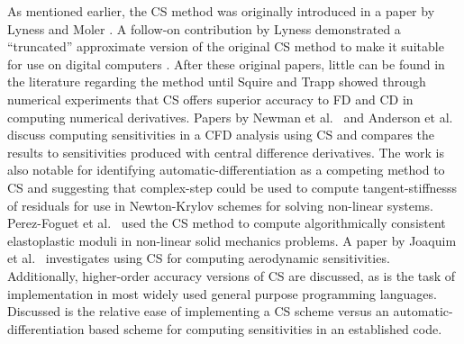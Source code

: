 \documentclass[preprint,12pt]{elsarticle}
\begin{document}
As mentioned earlier, the CS method was originally introduced in a paper by Lyness and Moler \cite{lyness1967numerical}.  A follow-on contribution by Lyness demonstrated a ``truncated'' approximate version of the original CS method to make it suitable for use on digital computers \cite{lyness1968differentiation}.  After these original papers, little can be found in the literature regarding the method until Squire and Trapp showed through numerical experiments that CS offers superior accuracy to FD and CD \cite{squire1998using} in computing numerical derivatives. Papers by Newman et al.\ \cite{newman1998} and Anderson et al.\ \cite{anderson2001sensitivity} discuss computing sensitivities in a CFD analysis using CS and compares the results to sensitivities produced with central difference derivatives. The work is also notable for identifying automatic-differentiation as a competing method to CS and suggesting that complex-step could be used to compute tangent-stiffnesss of residuals for use in Newton-Krylov schemes for solving non-linear systems. Perez-Foguet et al.\ \cite{perez2000numerical, perez2012numerical} used the CS method to compute algorithmically consistent elastoplastic moduli in non-linear solid mechanics problems.  A paper by Joaquim et al.\ \cite{martins2000automated} investigates using CS for computing aerodynamic sensitivities. Additionally, higher-order accuracy versions of CS are discussed, as is the task of implementation in most widely used general purpose programming languages. Discussed is the relative ease of implementing a CS scheme versus an automatic-differentiation based scheme for computing sensitivities in an established code.  
\end{document}
